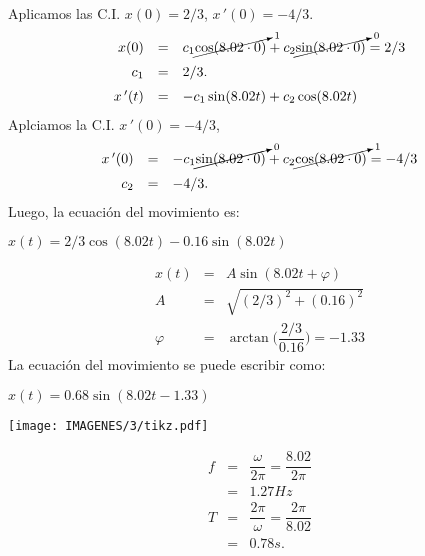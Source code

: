 \documentclass{beamer}
\begin{document}
\begin{frame}[t]
	\begin{exampleblock}{}
		Aplicamos las C.I. \(x(0) = 2/3\), \(x\,' (0) = -4/3\).
		\[
			\begin{array}{rcl}
				x(0) & = & c_1 \cancelto{1}{\cos (8.02 \cdot 0)} + c_2 \cancelto{0}{\sin (8.02 \cdot 0)} = 2/3 \\[2mm]
				c_1 & = & 2/3. \\[2mm]
				x\,'(t) & = & -c_1 \sin (8.02t) + c_2 \cos (8.02t)
			\end{array}
		\]
		Aplciamos la C.I. \(x\,'(0) = -4/3\),
		\[
			\begin{array}{rcl}
				x\,'(0) & = & -c_1 \cancelto{0}{\sin (8.02 \cdot 0)} + c_2 \cancelto{1}{\cos (8.02 \cdot 0)} = -4/3 \\[2mm]
				c_2 & = & -4/3.
			\end{array}
		\]
		Luego, la ecuación del movimiento es:
		\begin{center}
			\color{red} \underline{\color{black} \(x(t) = 2/3 \cos (8.02t) - 0.16 \sin (8.02t)\)}
		\end{center}
	\end{exampleblock}
\end{frame}

\begin{frame}[t]
	\begin{exampleblock}{}
		\[
			\begin{array}{rcl}
				x(t) & = & A \sin (8.02t+ \varphi) \\[2mm]
				A & = & \sqrt{(2/3) ^2+(0.16) ^2} \\[2mm]
				\varphi & = & \arctan \bigg(\dfrac{2/3}{0.16}\bigg) = -1.33
			\end{array}
		\]
		La ecuación del movimiento se puede escribir como:
		\begin{center}
			\color{red} \underline{\color{black} \(x(t) = 0.68 \sin (8.02t-1.33)\)}
		\end{center}
		\begin{minipage}{0.5\linewidth}
			\texttt{[image: IMAGENES/3/tikz.pdf]}
		\end{minipage}
		\begin{minipage}{0.4\linewidth}
			\[
				\begin{array}{rcl}
					f & = & \dfrac{\omega}{2 \pi} = \dfrac{8.02}{2 \pi} \\[2mm]
					& = & 1.27Hz \\[4mm]
					T & = & \dfrac{2 \pi}{\omega} = \dfrac{2 \pi}{8.02} \\[2mm]
					& = & 0.78s.
				\end{array}
			\]
		\end{minipage}
	\end{exampleblock}
\end{frame}
\end{document}
